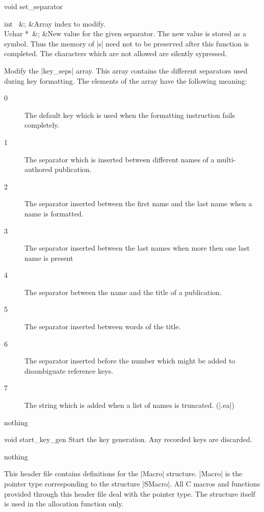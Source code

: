 \begin{Function}{void }{set\_separator}
  \begin{Arguments}
    int \ 	&;	&Array index to modify.\\
    Uchar *\ 	&;	&New value for the given separator. The new value is
stored as a symbol. Thus the memory of |s| need not to
be preserved after this function is completed.
The characters which are not allowed are silently sypressed.
  \end{Arguments}%
  Modify the |key\_seps| array. This array contains the
  different separators used during key formatting. The
  elements of the array have the following meaning:
  \begin{description}
  \item[0] The default key which is used when the
  formatting instruction fails completely.
  \item[1] The separator which is inserted between
  different names of a multi-authored publication.
  \item[2] The separator inserted between the first name
  and the last name when a name is formatted.
  \item[3] The separator inserted between the last names
  when more then one last name is present
  \item[4] The separator between the name and the title
  of a publication.
  \item[5] The separator inserted between words of the
  title.
  \item[6] The separator inserted before the number
  which might be added to disambiguate reference keys.
  \item[7] The string which is added when a list of
  names is truncated. (|.ea|)
  \end{description}
  \begin{Result}
    nothing
  \end{Result}
\end{Function}
\begin{Function}{void }{start\_key\_gen}  Start the key generation.
  Any recorded keys are discarded.
  \begin{Result}
    nothing
  \end{Result}
\end{Function}


This header file contains definitions for the |Macro|
structure. |Macro| is the pointer type corresponding to the
structure |SMacro|. All C macros and functions provided
through this header file deal with the pointer type. The
structure itself is used in the allocation function only.

